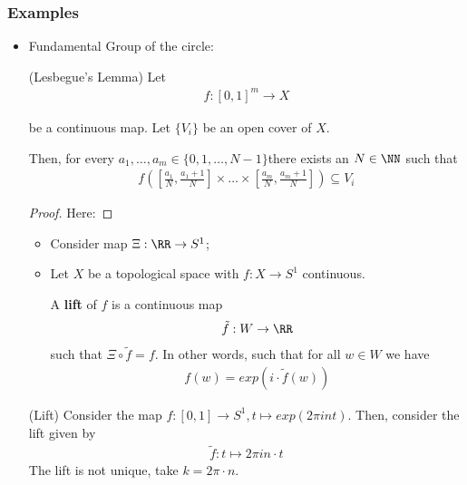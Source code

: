 \documentclass[Total.tex]{subfiles}
\begin{document}
	\subsubsection{Examples}
	\begin{itemize}
		\item Fundamental Group of the circle:
		\begin{lemma}
			(Lesbegue's Lemma) Let
			\begin{gather*}
				f:[0,1]^m\rightarrow X
			\end{gather*}
			
			be a continuous map. Let $\{V_i\}$ be an open cover of $X$. 
			
			Then, for every $a_1,\dots,a_m\in \{0,1,\dots,N-1\}$there exists an $N\in \NN$ such that
			\begin{gather*}
				f([\frac{a_1}{N},\frac{a_1+1}{N}]\times\dots\times [\frac{a_m}{N},\frac{a_m+1}{N}])\subseteq V_i
			\end{gather*}
		\end{lemma}
		\begin{proof}
			Here: 
		\end{proof}
		\begin{Def}
			\begin{itemize}
				\item Consider map $\Xi:\RR\rightarrow S^1$;
				\item Let $X$ be a topological space with $f:X\rightarrow S^1$ continuous.
				
				A \textbf{lift} of $f$ is a continuous map
				\begin{gather*}
					\tilde{f}:W\rightarrow \RR
				\end{gather*}
				such that $\Xi\circ \tilde{f}=f$. In other words, such that for all $w\in W$ we have
				\begin{gather*}
					f(w)=exp(i\cdot \tilde{f}(w))
				\end{gather*}
				\begin{center}
				\end{center}
			\end{itemize}
		\end{Def}
		
		\begin{example}
			(Lift) Consider the map $f:[0,1]\rightarrow S^1,t\mapsto exp(2\pi int)$. Then, consider the lift given by
			\begin{gather*}
				\tilde{f}:t\mapsto 2\pi in\cdot t
			\end{gather*}
			The lift is not unique, take $k=2\pi\cdot n$.
		\end{example}
		

\end{itemize}
\end{document}
